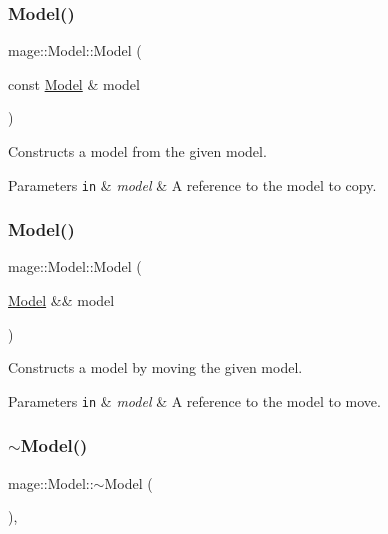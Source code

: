 \subsubsection{\texorpdfstring{Model()}{Model()}\hspace{0.1cm}{\footnotesize\ttfamily [3/4]}}
{\footnotesize\ttfamily mage\+::\+Model\+::\+Model (\begin{DoxyParamCaption}\item[{const \hyperlink{classmage_1_1_model}{Model} \&}]{model }\end{DoxyParamCaption})}

Constructs a model from the given model.


\begin{DoxyParams}[1]{Parameters}
\mbox{\tt in}  & {\em model} & A reference to the model to copy. \\
\hline
\end{DoxyParams}
\hypertarget{classmage_1_1_model_a71abc57cde3bd6270de88bfa3aa47601}{}\label{classmage_1_1_model_a71abc57cde3bd6270de88bfa3aa47601} 
\subsubsection{\texorpdfstring{Model()}{Model()}\hspace{0.1cm}{\footnotesize\ttfamily [4/4]}}
{\footnotesize\ttfamily mage\+::\+Model\+::\+Model (\begin{DoxyParamCaption}\item[{\hyperlink{classmage_1_1_model}{Model} \&\&}]{model }\end{DoxyParamCaption})\hspace{0.3cm}{\ttfamily [default]}}

Constructs a model by moving the given model.


\begin{DoxyParams}[1]{Parameters}
\mbox{\tt in}  & {\em model} & A reference to the model to move. \\
\hline
\end{DoxyParams}
\hypertarget{classmage_1_1_model_af9f45ed2dcf470f85bbfd144ca9857a7}{}\label{classmage_1_1_model_af9f45ed2dcf470f85bbfd144ca9857a7} 
\subsubsection{\texorpdfstring{$\sim$\+Model()}{~Model()}}
{\footnotesize\ttfamily mage\+::\+Model\+::$\sim$\+Model (\begin{DoxyParamCaption}{ }\end{DoxyParamCaption})\hspace{0.3cm}{\ttfamily [virtual]}, {\ttfamily [default]}}

